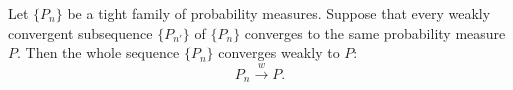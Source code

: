 Let $\{P_n\}$ be a tight family of probability measures. Suppose that every weakly convergent subsequence $\{P_{n'}\}$ of $\{P_n\}$ converges to the same probability measure $P$. Then the whole sequence $\{P_n\}$ converges weakly to $P$:
$$P_n \xrightarrow{w} P.$$
